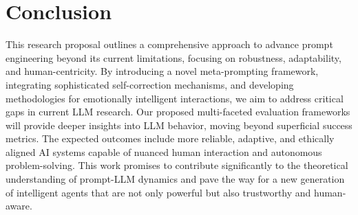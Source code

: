 \documentclass{article}
\begin{document}
\section{Conclusion}
This research proposal outlines a comprehensive approach to advance prompt engineering beyond its current limitations, focusing on robustness, adaptability, and human-centricity. By introducing a novel meta-prompting framework, integrating sophisticated self-correction mechanisms, and developing methodologies for emotionally intelligent interactions, we aim to address critical gaps in current LLM research. Our proposed multi-faceted evaluation frameworks will provide deeper insights into LLM behavior, moving beyond superficial success metrics. The expected outcomes include more reliable, adaptive, and ethically aligned AI systems capable of nuanced human interaction and autonomous problem-solving. This work promises to contribute significantly to the theoretical understanding of prompt-LLM dynamics and pave the way for a new generation of intelligent agents that are not only powerful but also trustworthy and human-aware.

\end{document}

